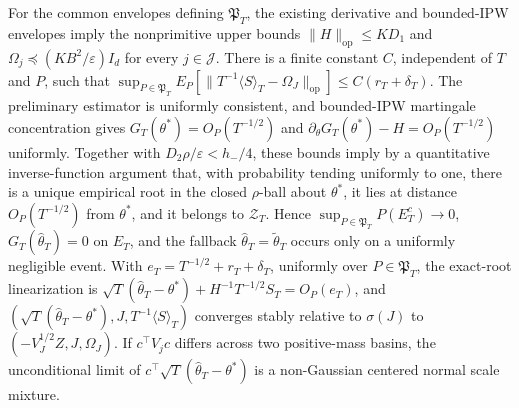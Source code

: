 For the common envelopes defining \(\mathfrak P_T\), the existing derivative and bounded-IPW envelopes imply the nonprimitive upper bounds \(\|H\|_{\mathrm{op}}\le KD_1\) and \(\Omega_j\preceq(KB^2/\varepsilon)I_d\) for every \(j\in\mathcal J\). There is a finite constant \(C\), independent of \(T\) and \(P\), such that \(\sup_{P\in\mathfrak P_T}E_P[\|T^{-1}\langle S\rangle_T-\Omega_J\|_{\mathrm{op}}]\le C(r_T+\delta_T)\). The preliminary estimator is uniformly consistent, and bounded-IPW martingale concentration gives \(G_T(\theta^*)=O_P(T^{-1/2})\) and \(\partial_\theta G_T(\theta^*)-H=O_P(T^{-1/2})\) uniformly. Together with \(D_2\rho/\varepsilon<h_-/4\), these bounds imply by a quantitative inverse-function argument that, with probability tending uniformly to one, there is a unique empirical root in the closed \(\rho\)-ball about \(\theta^*\), it lies at distance \(O_P(T^{-1/2})\) from \(\theta^*\), and it belongs to \(\mathcal Z_T\). Hence \(\sup_{P\in\mathfrak P_T}P(E_T^c)\to0\), \(G_T(\widehat\theta_T)=0\) on \(E_T\), and the fallback \(\widehat\theta_T=\widetilde\theta_T\) occurs only on a uniformly negligible event. With \(e_T=T^{-1/2}+r_T+\delta_T\), uniformly over \(P\in\mathfrak P_T\), the exact-root linearization is \(\sqrt T(\widehat\theta_T-\theta^*)+H^{-1}T^{-1/2}S_T=O_P(e_T)\), and \((\sqrt T(\widehat\theta_T-\theta^*),J,T^{-1}\langle S\rangle_T)\) converges stably relative to \(\sigma(J)\) to \((-V_J^{1/2}Z,J,\Omega_J)\). If \(c^\top V_jc\) differs across two positive-mass basins, the unconditional limit of \(c^\top\sqrt T(\widehat\theta_T-\theta^*)\) is a non-Gaussian centered normal scale mixture.